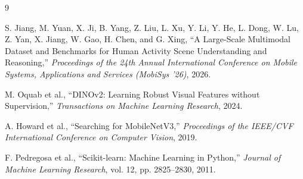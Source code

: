 \documentclass[12pt,a4paper]{article}
\begin{document}
\begin{thebibliography}{9}

S. Jiang, M. Yuan, X. Ji, B. Yang, Z. Liu, L. Xu, Y. Li, Y. He,
L. Dong, W. Lu, Z. Yan, X. Jiang, W. Gao, H. Chen, and G. Xing,
``A Large-Scale Multimodal Dataset and Benchmarks for Human Activity
Scene Understanding and Reasoning,''
\textit{Proceedings of the 24th Annual International Conference on Mobile
Systems, Applications and Services (MobiSys '26)}, 2026.

M. Oquab et al.,
``DINOv2: Learning Robust Visual Features without Supervision,''
\textit{Transactions on Machine Learning Research}, 2024.

A. Howard et al.,
``Searching for MobileNetV3,''
\textit{Proceedings of the IEEE/CVF International Conference on Computer
Vision}, 2019.

F. Pedregosa et al.,
``Scikit-learn: Machine Learning in Python,''
\textit{Journal of Machine Learning Research},
vol. 12, pp. 2825--2830, 2011.

\end{thebibliography}
\end{document}
